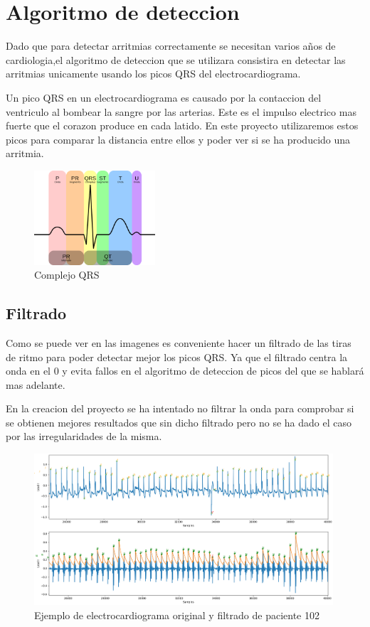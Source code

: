\section{Algoritmo de deteccion}
Dado que para detectar arritmias correctamente se necesitan varios años de cardiologia,el algoritmo de 
deteccion que se utilizara consistira en detectar las arritmias unicamente usando los picos QRS del electrocardiograma.

Un pico QRS en un electrocardiograma es causado por la contaccion del ventriculo al bombear la sangre por las arterias.
Este es el impulso electrico mas fuerte que el corazon produce en cada latido. En este proyecto utilizaremos estos picos
para comparar la distancia entre ellos y poder ver si se ha producido una arritmia. 

\begin{figure}[h!]
	\centering
	\includegraphics[width=0.4\textwidth]{./Images/img_introduccion/complejoQRS.png}
	\caption{Complejo QRS}
	\label{fig:complejoQRS}
\end{figure}

\subsection{Filtrado}
Como se puede ver en las imagenes es conveniente hacer un filtrado de las tiras de ritmo para poder detectar mejor
los picos QRS. Ya que el filtrado centra la onda en el 0 y evita fallos en el algoritmo de deteccion de picos del 
que se hablará mas adelante. 

En la creacion del proyecto se ha intentado no filtrar la onda para comprobar si se obtienen mejores resultados que
sin dicho filtrado pero no se ha dado el caso por las irregularidades de la misma.

\begin{figure}[h!]
	\centering
	\includegraphics[width=0.99\textwidth]{./Images/img_introduccion/102filtrado_y_sin_filtrar.png}
	\caption{Ejemplo de electrocardiograma original y filtrado de paciente 102}
	\label{fig:102filtradoysinfiltrar}
\end{figure}

